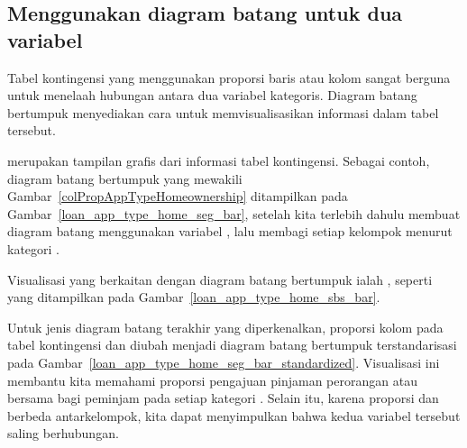 \subsection{Menggunakan diagram batang untuk dua variabel}
\label{bar_plots_subsection}

Tabel kontingensi yang menggunakan proporsi baris atau kolom
sangat berguna untuk menelaah hubungan antara dua variabel kategoris.
Diagram batang bertumpuk menyediakan cara untuk memvisualisasikan
informasi dalam tabel tersebut.

merupakan tampilan grafis dari informasi tabel kontingensi.
Sebagai contoh, diagram batang bertumpuk yang mewakili
Gambar~\ref{colPropAppTypeHomeownership}
ditampilkan pada Gambar~\ref{loan_app_type_home_seg_bar},
setelah kita terlebih dahulu membuat diagram batang menggunakan
variabel , lalu membagi setiap kelompok
menurut kategori \mbox{}.

Visualisasi yang berkaitan dengan diagram batang bertumpuk ialah
,
seperti yang ditampilkan pada
Gambar~\ref{loan_app_type_home_sbs_bar}.

Untuk jenis diagram batang terakhir yang diperkenalkan,
proporsi kolom pada tabel kontingensi
 dan 
diubah menjadi diagram batang bertumpuk terstandarisasi
pada Gambar~\ref{loan_app_type_home_seg_bar_standardized}.
Visualisasi ini membantu kita memahami proporsi pengajuan pinjaman
perorangan atau bersama bagi peminjam pada setiap kategori
.
Selain itu, karena proporsi 
dan  berbeda antarkelompok,
kita dapat menyimpulkan bahwa kedua variabel tersebut saling berhubungan.

